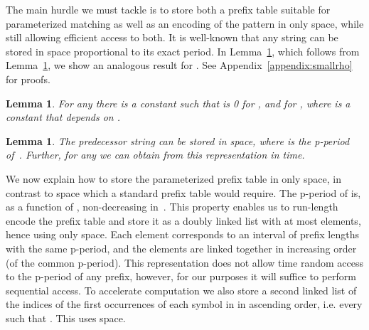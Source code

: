 \documentclass[11pt,a4paper]{article}
\theoremstyle{theorem}
\newtheorem{lemma}[theorem]{Lemma}
\newcommand{\pperiod}{\mbox{p-period}\xspace}
\begin{document}
 The main hurdle we must tackle is to store both a prefix table suitable for parameterized matching as well as an encoding of the pattern in only  space, while still allowing efficient access to both. It is well-known that any string  can be stored in space proportional to its exact period. In Lemma~\ref{lem:pred-const}, which follows from Lemma~\ref{lem:split}, we show an analogous result for .
 See Appendix~\ref{appendix:smallrho} for proofs.

\begin{lemma}\label{lem:split}
For any  there is a constant  such that  is 0 for , and  for , where  is a constant that depends on .
\end{lemma}


\begin{lemma}
    \label{lem:pred-const}
    The predecessor string  can be stored in  space, where  is the \pperiod of~. Further, for any  we can obtain  from this representation in  time.
\end{lemma}








We now explain how to store the parameterized prefix table in only  space, in contrast to  space which a standard prefix table would require. The \pperiod  of  is, as a function of , non-decreasing in~. This property enables us to run-length encode the prefix table and store it as a doubly linked list with at most  elements, hence using only  space. Each element corresponds to an interval of prefix lengths with the same \pperiod, and the elements are linked together in increasing order (of the common \pperiod).
This representation does not allow  time random access to the \pperiod of any prefix, however, for our purposes it will suffice to perform sequential access.
To accelerate computation we also store a second linked list of the indices of the first occurrences of each symbol in  in ascending order, i.e. every  such that . This uses  space.
\end{document}
